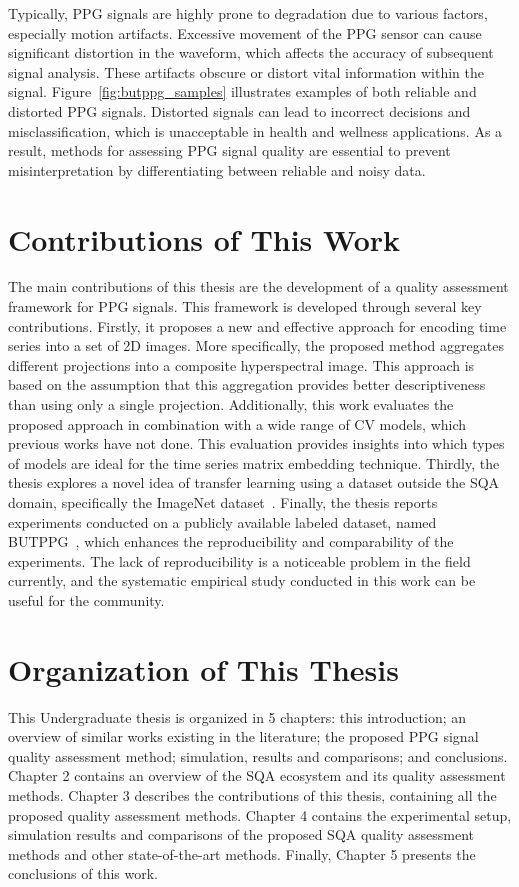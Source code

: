 Typically, \gls{PPG} signals are highly prone to degradation due to various factors, especially motion artifacts. Excessive movement of the \gls{PPG} sensor can cause significant distortion in the waveform, which affects the accuracy of subsequent signal analysis. These artifacts obscure or distort vital information within the signal. Figure~\ref{fig:butppg_samples} illustrates examples of both reliable and distorted \gls{PPG} signals. Distorted signals can lead to incorrect decisions and misclassification, which is unacceptable in health and wellness applications. As a result, methods for assessing \gls{PPG} signal quality are essential to prevent misinterpretation by differentiating between reliable and noisy data.

\section{Contributions of This Work}
\label{sec:my_work}

The main contributions of this thesis are the development of a quality assessment framework for \gls{PPG} signals. This framework is developed through several key contributions. Firstly, it proposes a new and effective approach for encoding time series into a set of 2D images. More specifically, the proposed method aggregates different projections into a composite hyperspectral image. This approach is based on the assumption that this aggregation provides better descriptiveness than using only a single projection. Additionally, this work evaluates the proposed approach in combination with a wide range of \gls{CV} models, which previous works have not done. This evaluation provides insights into which types of models are ideal for the time series matrix embedding technique. Thirdly, the thesis explores a novel idea of transfer learning using a dataset outside the \gls{SQA} domain, specifically the ImageNet dataset~\cite{ImageNet}. Finally, the thesis reports experiments conducted on a publicly available labeled dataset, named \gls{BUTPPG}~\cite{butppg}, which enhances the reproducibility and comparability of the experiments. The lack of reproducibility is a noticeable problem in the field currently, and the systematic empirical study conducted in this work can be useful for the community.

\section{Organization of This Thesis}
\label{sec:organization}

This Undergraduate thesis is organized in 5 chapters: this introduction; an overview of similar works existing in the literature; the proposed \gls{PPG} signal quality assessment method; simulation, results and comparisons; and conclusions. Chapter 2 contains an overview of the \gls{SQA} ecosystem and its quality assessment methods. Chapter 3 describes the contributions of this thesis, containing all the proposed quality assessment methods. Chapter 4 contains the experimental setup, simulation results and comparisons of the proposed \gls{SQA} quality assessment methods and other state-of-the-art methods. Finally, Chapter 5 presents the conclusions of this work. 


